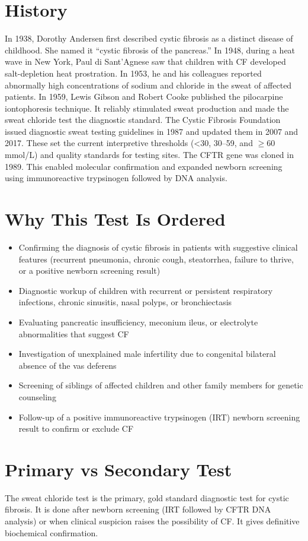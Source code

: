 \section*{History}
In 1938, Dorothy Andersen first described cystic fibrosis as a distinct disease of childhood. She named it ``cystic fibrosis of the pancreas.'' In 1948, during a heat wave in New York, Paul di Sant'Agnese saw that children with CF developed salt-depletion heat prostration. In 1953, he and his colleagues reported abnormally high concentrations of sodium and chloride in the sweat of affected patients. In 1959, Lewis Gibson and Robert Cooke published the pilocarpine iontophoresis technique. It reliably stimulated sweat production and made the sweat chloride test the diagnostic standard. The Cystic Fibrosis Foundation issued diagnostic sweat testing guidelines in 1987 and updated them in 2007 and 2017. These set the current interpretive thresholds (<30, 30--59, and $\geq$60 mmol/L) and quality standards for testing sites. The CFTR gene was cloned in 1989. This enabled molecular confirmation and expanded newborn screening using immunoreactive trypsinogen followed by DNA analysis.
\section*{Why This Test Is Ordered}
\begin{itemize}
  \item Confirming the diagnosis of cystic fibrosis in patients with suggestive clinical features (recurrent pneumonia, chronic cough, steatorrhea, failure to thrive, or a positive newborn screening result)
  \item Diagnostic workup of children with recurrent or persistent respiratory infections, chronic sinusitis, nasal polyps, or bronchiectasis
  \item Evaluating pancreatic insufficiency, meconium ileus, or electrolyte abnormalities that suggest CF
  \item Investigation of unexplained male infertility due to congenital bilateral absence of the vas deferens
  \item Screening of siblings of affected children and other family members for genetic counseling
  \item Follow-up of a positive immunoreactive trypsinogen (IRT) newborn screening result to confirm or exclude CF
\end{itemize}
\section*{Primary vs Secondary Test}
The sweat chloride test is the primary, gold standard diagnostic test for cystic fibrosis. It is done after newborn screening (IRT followed by CFTR DNA analysis) or when clinical suspicion raises the possibility of CF. It gives definitive biochemical confirmation.
